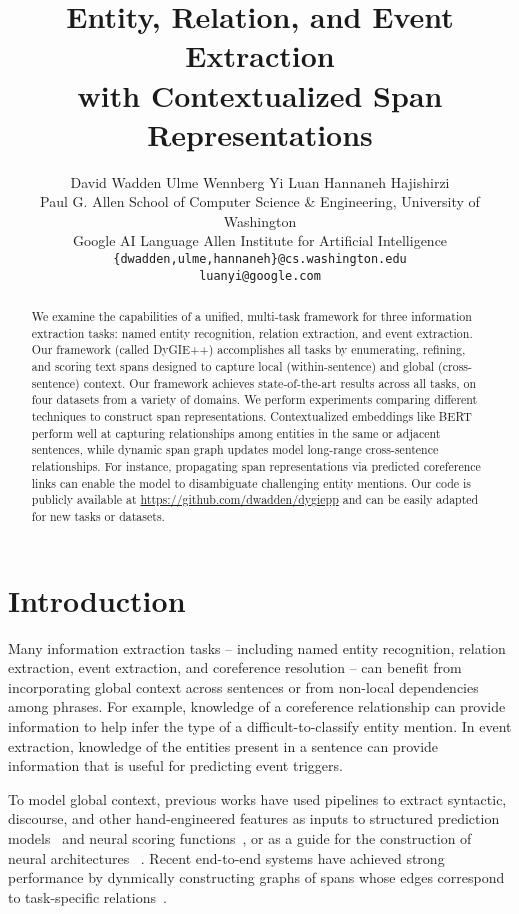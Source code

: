 \documentclass[11pt,a4paper]{article}
\title{Entity, Relation, and Event Extraction \\ with Contextualized Span Representations}
\author{
  David Wadden \quad Ulme Wennberg \quad Yi Luan \quad Hannaneh Hajishirzi \\
    Paul G. Allen School of Computer Science \& Engineering, University of Washington\\
    Google AI Language Allen Institute for Artificial Intelligence\\
  \texttt{\{dwadden,ulme,hannaneh\}@cs.washington.edu} \\
  \texttt{luanyi@google.com}\\
}
\date{}
\newcommand{\ours}{{\sc DyGIE++}}
\begin{document}
\maketitle

\begin{abstract}

  We examine the capabilities of a unified, multi-task framework for three information extraction tasks: named entity recognition, relation extraction, and event extraction. Our framework (called \ours) accomplishes all tasks by enumerating, refining, and scoring text spans designed to capture local (within-sentence) and global (cross-sentence) context. Our framework achieves state-of-the-art results across all tasks, on four datasets from a variety of domains. We perform experiments comparing different techniques to construct span representations. Contextualized embeddings like BERT perform well at capturing relationships among entities in the same or adjacent sentences, while dynamic span graph updates model long-range cross-sentence relationships. For instance, propagating span representations via predicted coreference links can enable the model to disambiguate challenging entity mentions. Our code is publicly available at \url{https://github.com/dwadden/dygiepp} and can be easily adapted for new tasks or datasets.

\end{abstract}
 \section{Introduction}

Many information extraction tasks  -- including named entity recognition, relation extraction, event extraction, and  coreference resolution -- can benefit from incorporating global context across sentences or from non-local dependencies among phrases. For example, knowledge of a coreference relationship can provide information to help infer the type of a difficult-to-classify entity mention.  In event extraction, knowledge of the entities present in a sentence can provide information that is useful for predicting event triggers.  

To model global context, previous works have used pipelines to extract syntactic, discourse, and other hand-engineered features as inputs to structured prediction models~\cite{Li2013JointEE, yang2016joint, li2014incremental} and neural scoring functions~\cite{Nguyen2019OneFA}, or as a guide for the construction of neural architectures ~\cite{peng2017cross, zhang2018graph, Sha2018JointlyEE, christopoulou2018walk}. Recent end-to-end systems have achieved strong performance by dynmically constructing graphs of spans whose edges correspond to  task-specific relations~\cite{luan2019general, lee2018higher,qian2019graphie}.  
\end{document}
